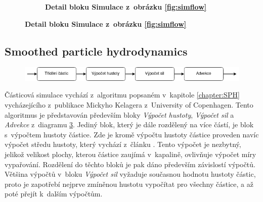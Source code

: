 \begin{figure}[h]
\begin{subfigure}[t]{.5\textwidth}
		\caption{\textbf{Detail bloku Simulace z~obrázku \ref{fig:simflow}}}
		\label{fig:simTypeflow}
	\end{subfigure}
	\label{fig:SimulationFlow}
\end{figure}

\subsection{Smoothed particle hydrodynamics}
\label{chapter:simSPH}

\begin{figure}[hb!]
	\centering
	\captionsetup{justification=centering}
	\includegraphics[scale=0.6]{obrazky-figures/SPH.png}
	\label{fig:SPHflow}
\end{figure}

Částicová simulace vychází z~algoritmu popsaném v~kapitole \ref{chapter:SPH} vycházejícího z~publikace \cite{KelagerSPH} Mickyho Kelagera z~University of Copenhagen. Tento algoritmus je představován především bloky \textit{Výpočet hustoty}, \textit{Výpočet sil} a \textit{Advekce} z~diagramu \ref{fig:SPHflow}. Jediný blok, který je dále rozdělený na více částí, je blok s~výpočtem hustoty částice. Zde je kromě výpočtu hustoty částice proveden navíc výpočet středu hustoty, který vychází z~článku \cite{sufaceSPH}. Tento výpočet je nezbytný, jelikož velikost plochy, kterou částice zaujímá v~kapalině, ovlivňuje výpočet míry vypařování. Rozdělení do těchto bloků je pak dáno především závislostí výpočtů. Většina výpočtů v~bloku \textit{Výpočet sil} vyžaduje současnou hodnotu hustoty částic, proto je zapotřebí nejprve zmíněnou hustotu vypočítat pro všechny částice, a až poté přejít k~dalším výpočtům.

